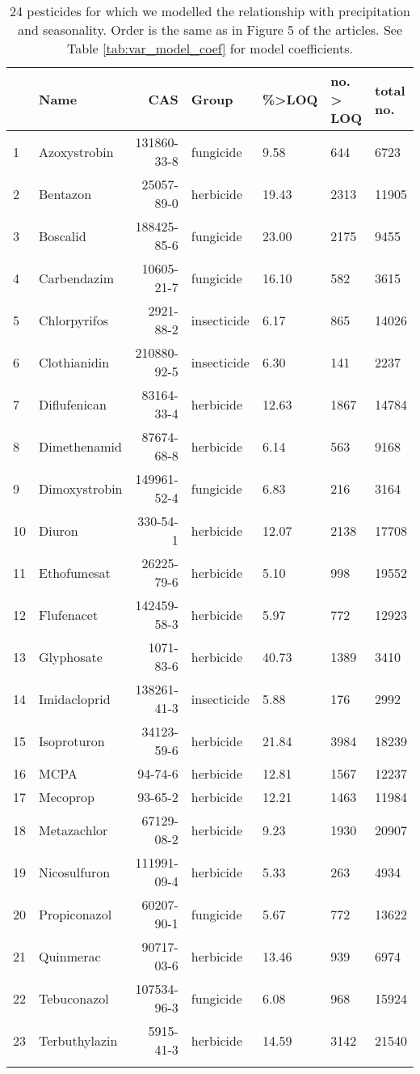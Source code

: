 \begingroup\fontsize{8pt}{10pt}\selectfont
\begin{longtable}{lp{2.5cm}rlp{1.5cm}p{2cm}p{2cm}}
\caption[24 pesticides for which we modelled the relationship with precipitation and seasonality.]{24 pesticides for which we modelled the relationship with precipitation and seasonality.
                    Order is the same as in Figure 5 of the articles. See Table \ref{tab:var_model_coef} for model coefficients.} \\ 
  \toprule
 & Name & CAS & Group & \%>LOQ & no. > LOQ & total no. \\ 
  \midrule
1 & Azoxystrobin & 131860-33-8 & fungicide & 9.58 & 644 & 6723 \\ 
  2 & Bentazon & 25057-89-0 & herbicide & 19.43 & 2313 & 11905 \\ 
  3 & Boscalid & 188425-85-6 & fungicide & 23.00 & 2175 & 9455 \\ 
  4 & Carbendazim & 10605-21-7 & fungicide & 16.10 & 582 & 3615 \\ 
  5 & Chlorpyrifos & 2921-88-2 & insecticide & 6.17 & 865 & 14026 \\ 
  6 & Clothianidin & 210880-92-5 & insecticide & 6.30 & 141 & 2237 \\ 
  7 & Diflufenican & 83164-33-4 & herbicide & 12.63 & 1867 & 14784 \\ 
  8 & Dimethenamid & 87674-68-8 & herbicide & 6.14 & 563 & 9168 \\ 
  9 & Dimoxystrobin & 149961-52-4 & fungicide & 6.83 & 216 & 3164 \\ 
  10 & Diuron & 330-54-1 & herbicide & 12.07 & 2138 & 17708 \\ 
  11 & Ethofumesat & 26225-79-6 & herbicide & 5.10 & 998 & 19552 \\ 
  12 & Flufenacet & 142459-58-3 & herbicide & 5.97 & 772 & 12923 \\ 
  13 & Glyphosate & 1071-83-6 & herbicide & 40.73 & 1389 & 3410 \\ 
  14 & Imidacloprid & 138261-41-3 & insecticide & 5.88 & 176 & 2992 \\ 
  15 & Isoproturon & 34123-59-6 & herbicide & 21.84 & 3984 & 18239 \\ 
  16 & MCPA & 94-74-6 & herbicide & 12.81 & 1567 & 12237 \\ 
  17 & Mecoprop & 93-65-2 & herbicide & 12.21 & 1463 & 11984 \\ 
  18 & Metazachlor & 67129-08-2 & herbicide & 9.23 & 1930 & 20907 \\ 
  19 & Nicosulfuron & 111991-09-4 & herbicide & 5.33 & 263 & 4934 \\ 
  20 & Propiconazol & 60207-90-1 & fungicide & 5.67 & 772 & 13622 \\ 
  21 & Quinmerac & 90717-03-6 & herbicide & 13.46 & 939 & 6974 \\ 
  22 & Tebuconazol & 107534-96-3 & fungicide & 6.08 & 968 & 15924 \\ 
  23 & Terbuthylazin & 5915-41-3 & herbicide & 14.59 & 3142 & 21540 \\ 
   \bottomrule
\label{tab:var_model}
\end{longtable}
\endgroup

